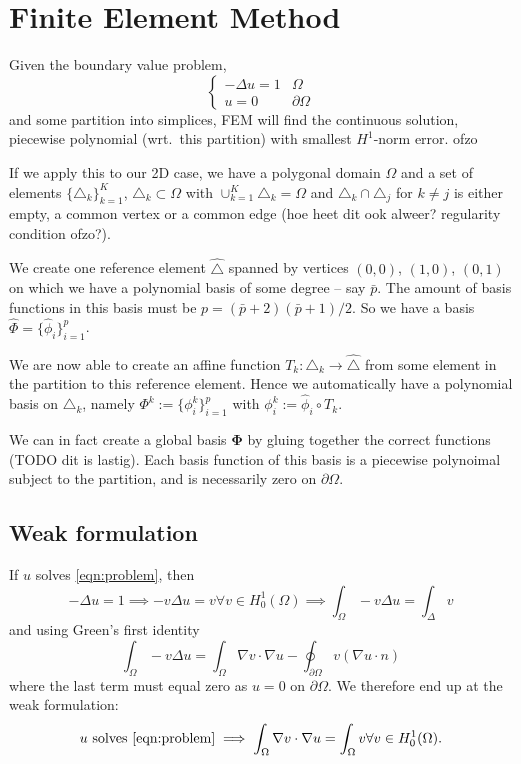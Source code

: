 \documentclass[11pt]{amsart}
\theoremstyle{definition}
\begin{document}
\section{Finite Element Method}
Given the boundary value problem, 
\begin{equation}
  \begin{cases} - \Delta u = 1 & \Omega \\ u = 0 & \partial \Omega \end{cases}
  \label{eqn:problem}
\end{equation}
and some partition into simplices, FEM will find the continuous solution, piecewise polynomial (wrt.~this partition) with smallest $H^1$-norm error. ofzo

If we apply this to our 2D case, we have a polygonal domain $\Omega$ and a set of elements $\{\triangle_k\}_{k=1}^K$, $\triangle_k \subset \Omega$ with $\cup_{k=1}^K \triangle_k = \Omega$ and $\triangle_k \cap \triangle_j$ for $k \not= j$ is either empty, a common vertex or a common edge (hoe heet dit ook alweer? regularity condition ofzo?).

We create one reference element $\hat \triangle$ spanned by vertices $(0,0)$, $(1, 0)$, $(0, 1)$ on which we have a polynomial basis of some degree -- say $\bar p$. The amount of basis functions in this basis must be $p = (\bar p + 2)(\bar p + 1)/2$. So we have a basis $\hat \Phi = \{ \hat \phi_i \}_{i=1}^p$.

We are now able to create an affine function $T_k: \triangle_k \to \hat \triangle$ from some element in the partition to this reference element. Hence we automatically have a polynomial basis on $\triangle_k$, namely $\Phi^k := \{ \phi^k_i \}_{i=1}^p$ with $\phi^k_i := \hat \phi_i \circ T_k$.

We can in fact create a global basis $\mathbf \Phi$ by gluing together the correct functions (TODO dit is lastig). Each basis function of this basis is a piecewise polynoimal subject to the partition, and is necessarily zero on $\partial \Omega$.

\subsection{Weak formulation}
If $u$ solves \eqref{eqn:problem}, then
\[
  -\Delta u = 1 \implies - v \Delta u = v \forall v \in H^1_0(\Omega) \implies \int_\Omega - v \Delta u = \int_\Delta v
\]
and using Green's first identity
\[
  \int_\Omega - v \Delta u = \int_\Omega \nabla v \cdot \nabla u - \oint_{\partial \Omega} v( \nabla u \cdot n)
\]
where the last term must equal zero as $u = 0$ on $\partial \Omega$. We therefore end up at the weak formulation:
\[
  u\text{ solves } \eqref{eqn:problem} \implies \int_{\Omega} \nabla v \cdot \nabla u = \int_\Omega v \forall v \in H^1_0(\Omega).
\]
\end{document}
